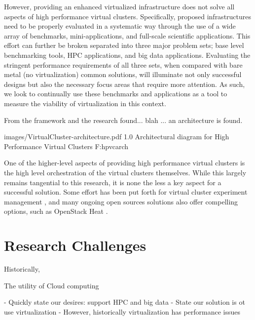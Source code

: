 However, providing an enhanced virtualized infrastructure does not solve all aspects of high performance virtual clusters. Specifically, proposed infrastructures need to be properly evaluated in a systematic way through the use of a wide array of benchmarks, mini-applications, and full-scale scientific applications. This effort can further be broken separated into three major problem sets; base level benchmarking tools, HPC applications, and big data applications. Evaluating the stringent performance requirements of all three sets, when compared with bare metal (no virtualization) common solutions, will illuminate not only successful designs but also the necessary focus areas that require more attention.  As such, we look to continually use these benchmarks and applications as a tool to measure the viability of virtualization in this context. 

From the framework and the research found... blah ... an architecture is found.  

  {images/VirtualCluster-architecture.pdf}
  {1.0}
  {Architectural diagram for High Performance Virtual Clusters}
  {F:hpvcarch}


One of the higher-level aspects of providing high performance virtual clusters is the high level orchestration of the virtual clusters themselves. While this largely remains tangential to this research, it is none the less a key aspect for a successful solution. Some effort has been put forth for virtual cluster experiment management \cite{las2010gce}, and many ongoing open sources solutions also offer compelling options, such as OpenStack Heat \cite{www-openstack-heat}.  


\section{Research Challenges}
\label{sec:chall}

Historically,  

The utility of Cloud computing


- Quickly state our desires: support HPC and big data
- State our solution is ot use virtualization
- However, historically virtualization has performance issues



